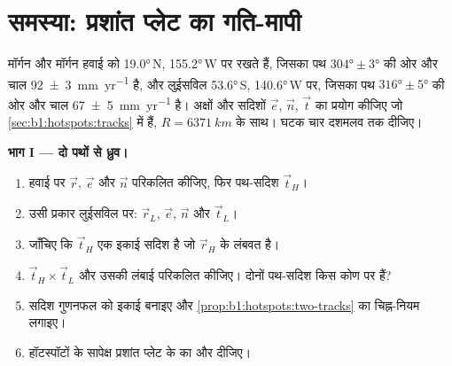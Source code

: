 \section{समस्या: प्रशांत प्लेट का गति-मापी}

\begin{problem}
\label{pb:b1:hotspots:1}
मॉर्गन और मॉर्गन हवाई  को \ang{19.0}\,N, \ang{155.2}\,W पर रखते हैं, जिसका पथ $\ang{304}\pm\ang{3}$ की ओर और चाल \qty[uncertainty-mode=separate]{92 \pm 3}{mm.yr^{-1}} है, और लुईसविल  \ang{53.6}\,S, \ang{140.6}\,W पर, जिसका पथ $\ang{316}\pm\ang{5}$ की ओर और चाल \qty[uncertainty-mode=separate]{67 \pm 5}{mm.yr^{-1}} है। अक्षों और सदिशों $\vec e$, $\vec n$, $\vec t$ का प्रयोग कीजिए जो \cref{sec:b1:hotspots:tracks} में हैं, $R = \qty{6371}{km}$ के साथ। घटक चार दशमलव तक दीजिए।

\medskip
\noindent\textbf{भाग I --- दो पथों से ध्रुव।}
\begin{enumerate}
  \item हवाई पर $\vec r$, $\vec e$ और $\vec n$ परिकलित कीजिए, फिर पथ-सदिश $\vec t_H$।
  \item उसी प्रकार लुईसविल पर: $\vec r_L$, $\vec e$, $\vec n$ और $\vec t_L$।
  \item जाँचिए कि $\vec t_H$ एक इकाई सदिश है जो $\vec r_H$ के लंबवत है।
  \item $\vec t_H\times\vec t_L$ और उसकी लंबाई परिकलित कीजिए। दोनों पथ-सदिश किस कोण पर हैं?
  \item सदिश गुणनफल को इकाई बनाइए और \cref{prop:b1:hotspots:two-tracks} का चिह्न-नियम लगाइए।
  \item हॉटस्पॉटों के सापेक्ष प्रशांत प्लेट के  का  और  दीजिए।
\end{enumerate}


\end{problem}
